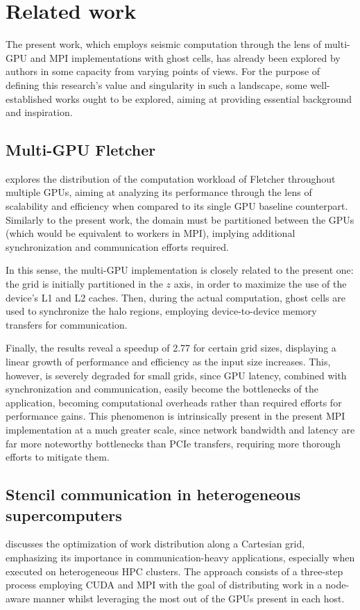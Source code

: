 \documentclass[cic,tc,english]{infufrgs}
\begin{document}
\chapter{Related work}
\label{ch:related_work}
The present work, which employs seismic computation through the lens of
multi-GPU and MPI implementations with ghost cells, has already been
explored by authors in some capacity from varying points of views.
For the purpose of defining this research's value and singularity in such
a landscape, some well-established works ought to be explored, aiming at
providing essential background and inspiration.

\section{Multi-GPU Fletcher}
 explores the distribution of the computation
workload of Fletcher
throughout multiple GPUs, aiming at analyzing its performance through the lens
of scalability and efficiency when compared to its single GPU
baseline counterpart. Similarly to the present work, the domain must
be partitioned between the GPUs (which would be equivalent to workers in MPI),
implying additional synchronization and communication efforts required.

In this sense, the multi-GPU implementation is closely related to the
present one:
the grid is initially partitioned in the $z$ axis, in order to
maximize the use
of the device's L1 and L2 caches. Then, during the actual
computation, ghost cells are used to synchronize the halo regions,
employing device-to-device memory transfers for communication.

Finally, the results reveal a speedup of 2.77 for certain grid sizes,
displaying a linear growth of performance and efficiency as the input size
increases. This, however, is severely degraded for small grids, since GPU
latency, combined with synchronization and communication, easily become the
bottlenecks of the application, becoming computational overheads rather than
required efforts for performance gains. This phenomenon is intrinsically present
in the present MPI implementation at a much greater scale, since
network bandwidth and latency are far more noteworthy bottlenecks
than PCIe transfers, requiring more thorough efforts to mitigate them.

\section{Stencil communication in heterogeneous supercomputers}
 discusses the optimization of
work distribution along a Cartesian grid, emphasizing its importance
in communication-heavy applications, especially when executed on heterogeneous
HPC clusters. The approach consists of a three-step process employing CUDA and
MPI with the goal of distributing work in a node-aware manner whilst leveraging
the most out of the GPUs present in each host.
\end{document}
